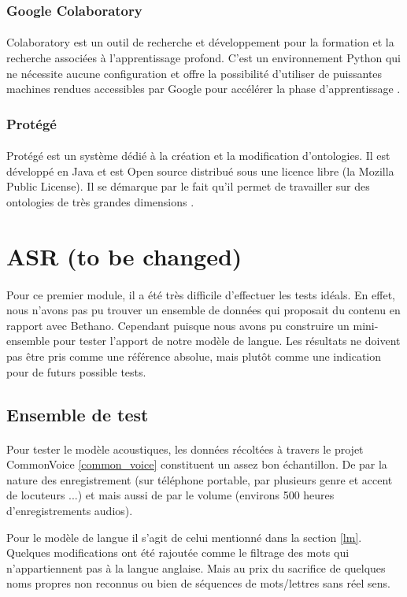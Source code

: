 		\subsubsection*{Google Colaboratory}
		\paragraph{}
		Colaboratory est un outil de recherche et développement pour la formation et la recherche associées à l'apprentissage profond. C'est un environnement Python qui ne nécessite aucune configuration et offre la possibilité d'utiliser de puissantes machines rendues accessibles par Google pour accélérer la phase d'apprentissage \cite{colab}.
		
		\subsubsection*{Protégé}
		\paragraph{}
		Protégé est un système dédié à la création et la modification d'ontologies. Il est développé en Java et est Open source distribué sous une licence libre (la Mozilla Public License). Il se démarque par le fait qu'il permet de travailler sur des ontologies de très grandes dimensions 
		\cite{protege}.
		
		
\section{ASR (to be changed)}
\paragraph{}
Pour ce premier module, il a été très difficile d'effectuer les tests idéals. En effet, nous n'avons pas pu trouver un ensemble de données qui proposait du contenu en rapport avec Bethano. Cependant puisque nous avons pu construire un mini-ensemble pour tester l'apport de notre modèle de langue. Les résultats ne doivent pas être pris comme une référence absolue, mais plutôt comme une indication pour de futurs possible tests.
	\subsection{Ensemble de test}
	\paragraph{}
	Pour tester le modèle acoustiques, les données récoltées à travers le projet CommonVoice \ref{common_voice} constituent un assez bon échantillon. De par la nature des enregistrement (sur téléphone portable, par plusieurs genre et accent de locuteurs ...) et mais aussi de par le volume (environs 500 heures d'enregistrements audios). 
	\par
	Pour le modèle de langue il s'agit de celui mentionné dans la section \ref{lm}. Quelques modifications ont été rajoutée comme le filtrage des mots qui n'appartiennent pas à la langue anglaise. Mais au prix du sacrifice de quelques noms propres non reconnus ou bien de séquences de mots/lettres sans réel sens.
